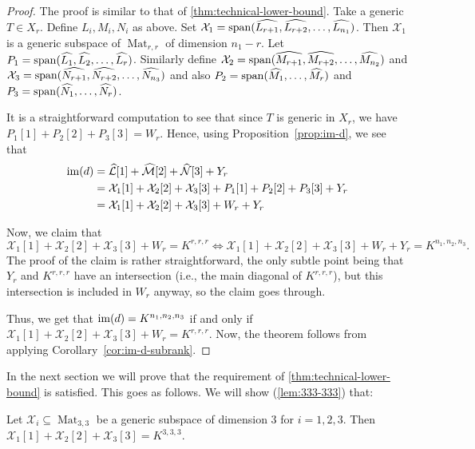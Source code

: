 \documentclass[11pt]{article}
\theoremstyle{definition}
\theoremstyle{remark}
\newcommand{\spa}{{\rm span}}
\newcommand{\Mat}{\operatorname{Mat}}
\newcommand{\im}{{\rm im}}
\begin{document}
%

%

\begin{proof}
The proof is similar to that of \autoref{thm:technical-lower-bound}.
Take a generic $T \in X_r$. Define $L_i, M_i, N_i$ as above. Set $\mathcal{X}_1 = \spa (\widehat{L_{r+1}}, \widehat{L_{r+2}}, \dots, \widehat{L_{n_1}})$. Then $\mathcal{X}_1$ is a generic subspace of $\Mat_{r,r}$ of dimension $n_1 - r$. Let $P_1 = \spa (\widehat{L_1}, \widehat{L_2},\dots,\widehat{L_r})$. Similarly define $\mathcal{X}_2 = \spa (\widehat{M_{r+1}}, \widehat{M_{r+2}}, \dots, \widehat{M_{n_2}})$ and $\mathcal{X}_3 = \spa (\widehat{N_{r+1}}, \widehat{N_{r+2}}, \dots, \widehat{N_{n_3}})$ and also $P_2 = \spa (\widehat{M_1},\dots,\widehat{M_r})$ and $P_3 = \spa (\widehat{N_1}, \dots, \widehat{N_r})$.

It is a straightforward computation to see that since $T$ is generic in $X_r$, we have $P_1[1] + P_2[2] + P_3[3] = W_r$.
Hence, using Proposition~\ref{prop:im-d}, we see that 
\begin{align*}
\im(d) &= \mathcal{\widehat{L}}[1] + \mathcal{\widehat{M}}[2] + \mathcal{\widehat{N}}[3] + Y_r \\
&= \mathcal{X}_1[1] + \mathcal{X}_2[2] + \mathcal{X}_3[3] + P_1[1] + P_2[2] + P_3[3] +  Y_r  \\
& = \mathcal{X}_1[1] + \mathcal{X}_2[2] + \mathcal{X}_3[3] + W_r + Y_r
\end{align*}

Now, we claim that 
$$
\mathcal{X}_1[1] + \mathcal{X}_2[2] + \mathcal{X}_3[3] + W_r = K^{r,r,r} \Leftrightarrow \mathcal{X}_1[1] + \mathcal{X}_2[2] + \mathcal{X}_3[3] + W_r + Y_r = K^{n_1,n_2,n_3}.
$$
The proof of the claim is rather straightforward, the only subtle point being that $Y_r$ and $K^{r,r,r}$ have an intersection (i.e., the main diagonal of $K^{r,r,r}$), but this intersection is included in $W_r$ anyway, so the claim goes through.

Thus, we get that $\im(d) = K^{n_1,n_2,n_3}$ if and only if $\mathcal{X}_1[1] + \mathcal{X}_2[2] + \mathcal{X}_3[3] + W_r = K^{r,r,r}$. Now, the theorem follows from applying Corollary~\ref{cor:im-d-subrank}.
\end{proof}

%


In the next section we will prove that the requirement of \autoref{thm:technical-lower-bound} is satisfied. This goes as follows. We will show (\autoref{lem:333-333}) that:

\begin{lemma}\label{lem:333}
Let $\mathcal{X}_i \subseteq \Mat_{3,3}$ be a generic subspace of dimension 3 for $i=1,2,3$. Then $\mathcal{X}_1[1]+\mathcal{X}_2[2]+\mathcal{X}_3[3] = K^{3,3,3}$.
\end{lemma}
\end{document}
